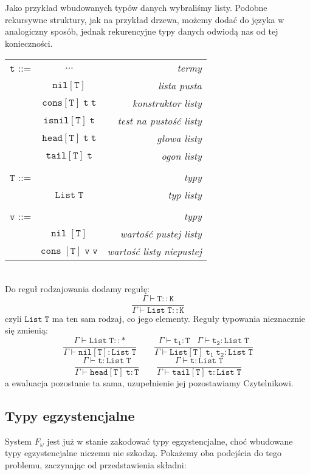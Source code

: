 \documentclass[11pt,leqno]{article}
\begin{document}
Jako przykład wbudowanych typów danych wybraliśmy listy. Podobne rekursywne struktury, jak na przykład drzewa, możemy dodać do języka w analogiczny sposób, jednak rekurencyjne typy danych odwiodą nas od tej konieczności. \\
  
\begin{tabular}{| l c r |}
  \hline
  $\mathtt{t}$ ::= & $\dots$ & \textit{termy}  \\
   & $\mathtt{nil[T]}$ & \textit{lista pusta}  \\
   & $\mathtt{cons[T]\;t\;t}$ & \textit{konstruktor listy} \\
   & $\mathtt{isnil[T]\;t}$ & \textit{test na pustość listy} \\
   & $\mathtt{head[T]\;t\;t}$ & \textit{głowa listy} \\
   & $\mathtt{tail[T]\;t}$ & \textit{ogon listy} \\
   & & \\
  $\mathtt{T}$ ::= &  & \textit{typy} \\
   & $\mathtt{List\;T}$ & \textit{typ listy} \\
   & & \\
  $\mathtt{v}$ ::= &  & \textit{typy} \\
   & $\mathtt{nil\;[T]}$ & \textit{wartość pustej listy} \\
   & $\mathtt{cons\;[T]\;v\;v}$ & \textit{wartość listy niepustej} \\
  \hline
\end{tabular} \\

Do reguł rodzajowania dodamy regułę:
 	\[\mathtt{ \frac{\Gamma \vdash T::K}{\Gamma \vdash List\;T::K}
		}
	\]
czyli $\mathtt{List\;T}$ ma ten sam rodzaj, co jego elementy.
Reguły typowania nieznacznie się zmienią:
 	\[\mathtt{ \frac{\Gamma \vdash List\;T :: \ast}{\Gamma \vdash nil[T] : List\;T } \qquad \frac{\Gamma \vdash t_1:T \;\;\;\Gamma \vdash t_2:List\;T}{\Gamma \vdash List[T]\;t_1\;t_2:List\;T}
		}
	\]
 	\[\mathtt{ \frac{\Gamma \vdash t:List\;T }{\Gamma \vdash head[T]\;t : T } \qquad \frac{\Gamma \vdash t:List\;T }{\Gamma \vdash tail[T]\;t : List\;T }
		}
	\]
a ewaluacja pozostanie ta sama, uzupełnienie jej pozostawiamy Czytelnikowi.
\subsection{Typy egzystencjalne}

System $F_\omega$ jest już w stanie zakodować typy egzystencjalne, choć wbudowane typy egzystencjalne niczemu nie szkodzą. Pokażemy oba podejścia do tego problemu, zaczynając od przedstawienia składni: \\
\end{document}
